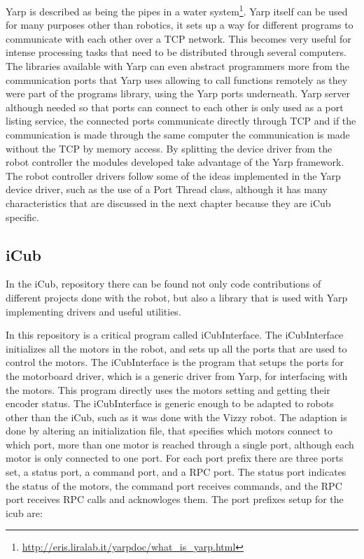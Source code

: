 	Yarp is described as being the pipes in a water system\footnote{\url{http://eris.liralab.it/yarpdoc/what_is_yarp.html}}. Yarp itself can be used for many purposes other than robotics, it sets up a way for different programs to communicate with each other over a \ac{TCP} network. This becomes very useful for intense processing tasks that need to be distributed through several computers. The libraries available with Yarp can even abstract programmers more from the communication ports that Yarp uses allowing to call functions remotely as they were part of the programs library, using the Yarp ports underneath. Yarp server although needed so that ports can connect to each other is only used as a port listing service, the connected ports communicate directly through \ac{TCP} and if the communication is made through the same computer the communication is made without the \ac{TCP} by memory access. By splitting the device driver from the robot controller the modules developed take advantage of the Yarp framework. The robot controller drivers follow some of the ideas implemented in the Yarp device driver, such as the use of a Port Thread class, although it has many characteristics that are discussed in the next chapter because they are iCub specific. 

\subsection{iCub}
	
	In the iCub, repository there can be found not only code contributions of different projects done with the robot, but also a library that is used with Yarp implementing drivers and useful utilities.
	
	In this repository is a critical program called iCubInterface. The iCubInterface initializes all the motors in the robot, and sets up all the ports that are used to control the motors. The iCubInterface is the program that setups the ports for the motorboard driver, which is a generic driver from Yarp, for interfacing with the motors. This program directly uses the motors setting and getting their encoder status. The iCubInterface is generic enough to be adapted to robots other than the iCub, such as it was done with the Vizzy robot. The adaption is done by altering an initialization file, that specifies which motors connect to which port, more than one motor is reached through a single port, although each motor is only connected to one port. For each port prefix there are three ports set, a status port, a command port, and a \ac{RPC} port. The status port indicates the status of the motors, the command port receives commands, and the \ac{RPC} port receives \ac{RPC} calls and acknowloges them. The port prefixes setup for the icub are:


